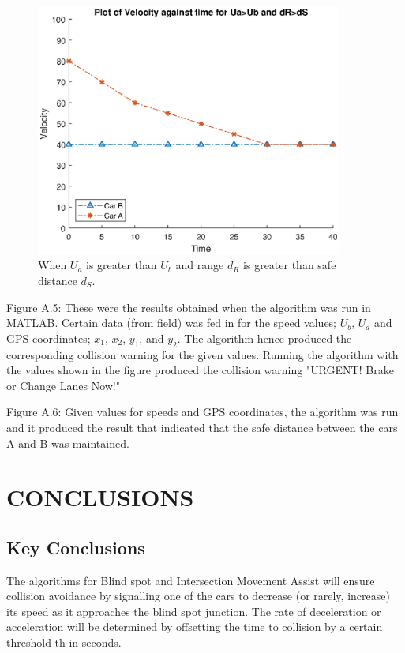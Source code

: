\documentclass[12pt]{report}
\begin{document}
\begin{figure}[!hb]
	\includegraphics[width=0.9\textwidth]{deceleration.eps}
	\caption{When $U_a$ is greater than $U_b$ and range $d_R$ is greater than safe distance $d_S$.}
	\label{fig}
\end{figure}

Figure A.5: These were the results obtained when the algorithm was run in MATLAB. Certain data (from field) was fed in for the speed values; $U_b$, $U_a$ and GPS coordinates; $x_1$, $x_2$, $y_1$, and $y_2$. The algorithm hence produced the corresponding collision warning for the given values.
Running the algorithm with the values shown in the figure produced the collision warning "URGENT! Brake or Change Lanes Now!"
 
Figure A.6: Given values for speeds and GPS coordinates, the algorithm was run and it produced the result that indicated that the safe distance between the cars A and B was maintained.


\chapter{CONCLUSIONS}

\section{Key Conclusions}
The algorithms for Blind spot and Intersection Movement Assist will ensure collision avoidance by signalling one of the cars to decrease (or rarely, increase) its speed as it approaches the blind spot junction. The rate of deceleration or acceleration will be determined by offsetting the time to collision by a certain threshold th in seconds.
\end{document}
